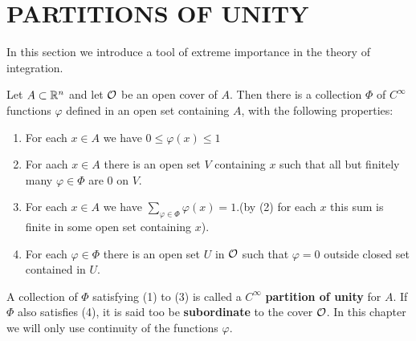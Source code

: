 \clearpage
\section{PARTITIONS OF UNITY}
In this section we introduce a tool of extreme importance in
the theory of integration.

\begin{theorem}
    Let $A \subset \mathbb{R}^n$ and let $\mathcal{O}$ be an open cover of $A$.
    Then there is a collection $\Phi$ of $C^\infty$ functions $\varphi$ defined in an open
    set containing $A$, with the following properties:
    \begin{enumerate}[label=\upshape{(\arabic*)}]
        \item For each $x\in A$ we have $0\le \varphi(x)\le 1$ 
        \item For aach $x\in A$ there is an open set $V$ containing $x$ such that 
            all but finitely many $\varphi\in \Phi$ are 0 on $V$.
        \item For each $x\in A$ we have $\sum_{\varphi\in \Phi}\varphi(x)=1$.(by (2) for each 
            $x$ this sum is finite in some open set containing $x$).
        \item For each $\varphi\in \Phi$ there is an open set $U$ in $\mathcal{O}$ 
            such that $\varphi=0$ outside closed set contained in $U$. 
    \end{enumerate}
\end{theorem}

A collection of $\Phi$ satisfying (1) to (3) is called a $C^\infty$ \textbf{partition of unity}
for $A$. If $\Phi$ also satisfies (4), it is said too be \textbf{subordinate} to the cover $\mathcal{O}$.
In this chapter we will only use continuity of the functions $\varphi$.

